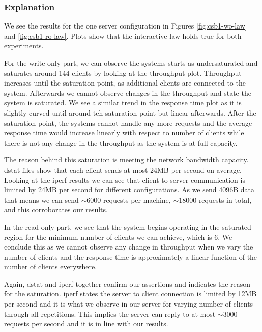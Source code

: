 \documentclass[11pt,a4paper]{article}
\begin{document}
\subsubsection{Explanation} \label{sec:csb1-exp}
We see the results for the one server configuration in Figures \ref{fig:csb1-wo-law} and \ref{fig:csb1-ro-law}. Plots show that the interactive law holds true for both experiments.

\par For the write-only part, we can observe the systems starts as undersaturated and saturates around 144 clients by looking at the throughput plot. Throughput increases until the saturation point, as additional clients are connected to the system. Afterwards we cannot observe changes in the throughput and state the system is saturated. We see a similar trend in the response time plot as it is slightly curved until around teh saturation point but linear afterwards. After the saturation point, the systems cannot handle any more requests and the average response time would increase linearly with respect to number of clients while there is not any change in the throughput as the system is at full capacity.
\par The reason behind this saturation is meeting the network bandwidth capacity. dstat files show that each client sends at most 24MB per second on average. Looking at the iperf results we can see that client to server communication is limited by 24MB per second for different configurations. As we send 4096B data that means we can send $\sim 6000$ requests per machine, $\sim 18000$ requests in total, and this corroborates our results.

\par In the read-only part, we see that the system begins operating in the saturated region for the minimum number of clients we can achieve, which is 6. We conclude this as we cannot observe any change in throughput when we vary the number of clients and the response time is approximately a linear function of the number of clients everywhere.
\par Again, dstat and iperf together confirm our assertions and indicates the reason for the saturation. iperf states the server to client connection is limited by 12MB per second and it is what we observe in our server for varying number of clients through all repetitions. This implies the server can reply to at most $\sim 3000$ requests per second and it is in line with our results.
\end{document}
